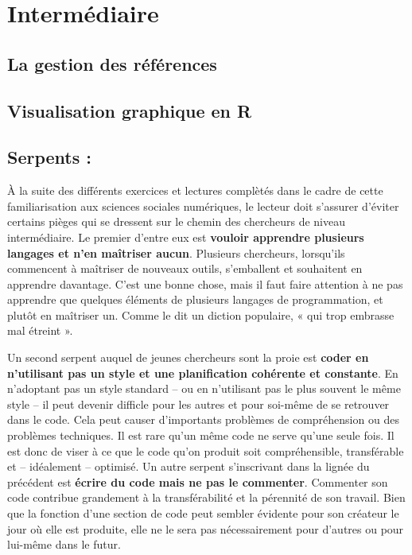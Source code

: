 \documentclass[
  letterpaper,
]{scrbook}
\begin{document}
\hypertarget{intermuxe9diaire}{%
\section{Intermédiaire}\label{intermuxe9diaire}}

\hypertarget{la-gestion-des-ruxe9fuxe9rences}{%
\subsection{La gestion des
références}\label{la-gestion-des-ruxe9fuxe9rences}}

\hypertarget{visualisation-graphique-en-r}{%
\subsection{Visualisation graphique en
R}\label{visualisation-graphique-en-r}}

\hypertarget{serpents-1}{%
\subsection{Serpents :}\label{serpents-1}}

À la suite des différents exercices et lectures complètés dans le cadre
de cette familiarisation aux sciences sociales numériques, le lecteur
doit s'assurer d'éviter certains pièges qui se dressent sur le chemin
des chercheurs de niveau intermédiaire. Le premier d'entre eux est
\textbf{vouloir apprendre plusieurs langages et n'en maîtriser aucun}.
Plusieurs chercheurs, lorsqu'ils commencent à maîtriser de nouveaux
outils, s'emballent et souhaitent en apprendre davantage. C'est une
bonne chose, mais il faut faire attention à ne pas apprendre que
quelques éléments de plusieurs langages de programmation, et plutôt en
maîtriser un. Comme le dit un diction populaire, « qui trop embrasse mal
étreint ».

Un second serpent auquel de jeunes chercheurs sont la proie est
\textbf{coder en n'utilisant pas un style et une planification cohérente
et constante}. En n'adoptant pas un style standard -- ou en n'utilisant
pas le plus souvent le même style -- il peut devenir difficle pour les
autres et pour soi-même de se retrouver dans le code. Cela peut causer
d'importants problèmes de compréhension ou des problèmes techniques. Il
est rare qu'un même code ne serve qu'une seule fois. Il est donc de
viser à ce que le code qu'on produit soit compréhensible, transférable
et -- idéalement -- optimisé. Un autre serpent s'inscrivant dans la
lignée du précédent est \textbf{écrire du code mais ne pas le
commenter}. Commenter son code contribue grandement à la transférabilité
et la pérennité de son travail. Bien que la fonction d'une section de
code peut sembler évidente pour son créateur le jour où elle est
produite, elle ne le sera pas nécessairement pour d'autres ou pour
lui-même dans le futur.
\end{document}
